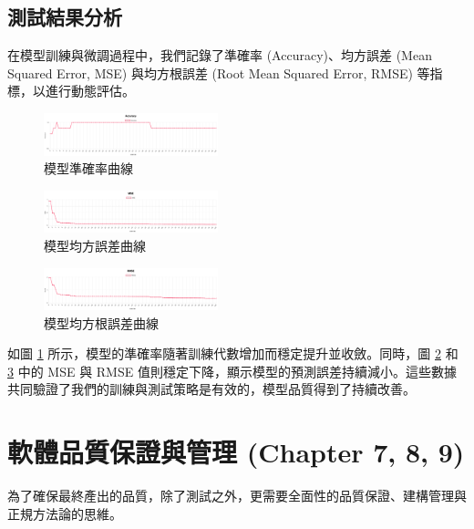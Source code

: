 \documentclass[twocolumn,11pt,a4paper]{article}
\begin{document}
\subsection{測試結果分析}
在模型訓練與微調過程中，我們記錄了準確率 (Accuracy)、均方誤差 (Mean Squared Error, MSE) 與均方根誤差 (Root Mean Squared Error, RMSE) 等指標，以進行動態評估。
\begin{figure}[htbp]
    \centering
    \includegraphics[width=0.45\textwidth]{res/image/accuracy.png}
    \caption{模型準確率曲線}
    \label{fig:accuracy_curve}
\end{figure}
\begin{figure}[htbp]
    \centering
    \includegraphics[width=0.45\textwidth]{res/image/mse.png}
    \caption{模型均方誤差曲線}
    \label{fig:mse_curve}
\end{figure}
\begin{figure}[htbp]
    \centering
    \includegraphics[width=0.45\textwidth]{res/image/rmse.png}
    \caption{模型均方根誤差曲線}
    \label{fig:rmse_curve}
\end{figure}

如圖 \ref{fig:accuracy_curve} 所示，模型的準確率隨著訓練代數增加而穩定提升並收斂。同時，圖 \ref{fig:mse_curve} 和 \ref{fig:rmse_curve} 中的 MSE 與 RMSE 值則穩定下降，顯示模型的預測誤差持續減小。這些數據共同驗證了我們的訓練與測試策略是有效的，模型品質得到了持續改善。

\section{軟體品質保證與管理 (Chapter 7, 8, 9)}
為了確保最終產出的品質，除了測試之外，更需要全面性的品質保證、建構管理與正規方法論的思維。
\end{document}
